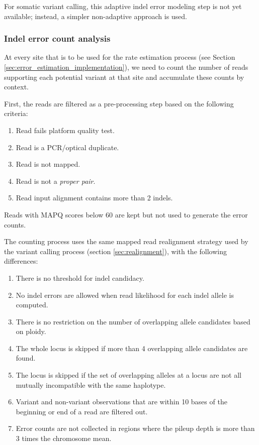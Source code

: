 \documentclass{article}
\begin{document}
For somatic variant calling, this adaptive indel error modeling step is not yet available; instead, a simpler non-adaptive approach is used.

\subsubsection{Indel error count analysis}
At every site that is to be used for the rate estimation process (see Section \ref{sec:error_estimation_implementation}), we need to count the number of reads supporting each potential variant at that site and accumulate these counts by context.

First, the reads are filtered as a pre-processing step based on the following criteria:
    \begin{enumerate}
        \item Read fails platform quality test.
        \item Read is a PCR/optical duplicate.
        \item Read is not mapped.
        \item Read is not a \emph{proper pair}.
        \item Read input alignment contains more than 2 indels.
    \end{enumerate}
Reads with MAPQ scores below 60 are kept but not used to generate the error counts.

The counting process uses the same mapped read realignment strategy used by the variant calling process (section \ref{sec:realignment}), with the following differences:
 \begin{enumerate}
    \item \label{no_threshold_for_indel} There is no threshold for indel candidacy.
    \item \label{no_indel_errors_allowed} No indel errors are allowed when read likelihood for each indel allele is computed.
    \item There is no restriction on the number of overlapping allele candidates based on ploidy.
    \item The whole locus is skipped if more than 4 overlapping allele candidates are found.
    \item The locus is skipped if the set of overlapping alleles at a locus are not all mutually incompatible with the same haplotype. 
    \item Variant and non-variant observations that are within 10 bases of the beginning or end of a read are filtered out.
    \item Error counts are not collected in regions where the pileup depth is more than 3 times the chromosome mean.
 \end{enumerate}
\end{document}
